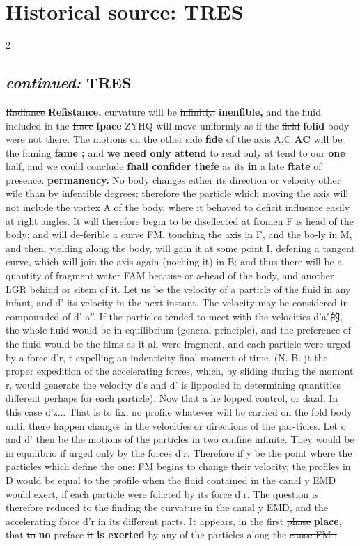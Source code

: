 \documentclass[10pt]{article}
\begin{document}
\section*{Historical source: TRES}
\begin{multicols}{2}
\subsection*{\textit{continued:} TRES}
\sout{Radiance} \textbf{Refistance.} curvature will be \sout{infinitly,} \textbf{inenfible,} and the fluid included in the \sout{frace} \textbf{fpace} ZYHQ will move uniformly as if the \sout{field} \textbf{folid} body were not there. The motions on the other \sout{side} \textbf{fide} of the axis \sout{A,C} \textbf{AC} will be the \sout{faming} \textbf{fame ;} and \textbf{we need only attend} to \sout{read only at tend to our} \textbf{one} half, and we \sout{could conclude} \textbf{fhall confider thefe} as \sout{its} \textbf{in} a \sout{late} \textbf{ftate} of \sout{presence.} \textbf{permanency.} No body changes either its direction or velocity other wile than by infentible degrees; therefore the particle which moving the axis will not include the vortex A of the body, where it behaved to deficit influence easily at right angles. It will therefore begin to be diseflected at fromen F is head of the body; and will de-ferible a curve FM, touching the axis in F, and the bo-ly in M, and then, yielding along the body, will gain it at some point I, defening a tangent curve, which will join the axis again (noching it) in B; and thus there will be a quantity of fragment water FAM because or a-head of the body, and another LGR behind or sitem of it. Let us be the velocity of a particle of the fluid in any infant, and d’ its velocity in the next instant. The velocity may be considered in compounded of d’ a”. If the particles tended to meet with the velocities d’a"的, the whole fluid would be in equilibrium (general principle), and the preference of the fluid would be the films as it all were fragment, and each particle were urged by a force d’r, t expelling an indenticity final moment of time. (N. B. jt the proper expedition of the accelerating forces, which, by sliding during the moment r, would generate the velocity d’s and d’ is lippooled in determining quantities different perhaps for each particle). Now that a he lopped control, or dazd. In this case d’z... That is to fix, no profile whatever will be carried on the fold body until there happen changes in the velocities or directions of the par-ticles. Let o and d’ then be the motions of the particles in two confine infinite. They would be in equilibrio if urged only by the forces d’r. Therefore if y be the point where the particles which define the one: FM begins to change their velocity, the profiles in D would be equal to the profile when the fluid contained in the canal y EMD would exert, if each particle were folicted by its force d’r. The question is therefore reduced to the finding the curvature in the canal y EMD, and the accelerating force d’r in its different parts. It appears, in the first \sout{phase} \textbf{place,} that \sout{to} \textbf{no} preface \sout{it} \textbf{is exerted} by any of the particles along the \sout{cause FM :} 
\end{multicols}
\end{document}

